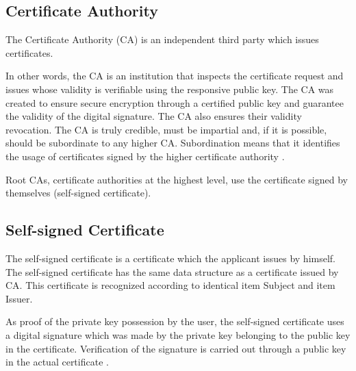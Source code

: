 \documentclass[
  digital, %
  notable,   %
  lof,     %
  lot,     %
]{fithesis3}
\begin{document}
\subsection{Certificate Authority}
The Certificate Authority (CA) is an independent third party which issues certificates.

In other words, the CA is an institution that inspects the certificate request and issues whose 
validity is verifiable using the responsive public key. The CA was created %
to ensure secure encryption through a certified public key and guarantee the validity of the 
digital signature. The CA also ensures their validity revocation. The CA is truly credible, must 
be impartial and, if it is possible, should be subordinate to any higher CA. Subordination means 
that it identifies the usage of certificates signed by the higher certificate authority 
\cite{dostalek2016velky}.

Root CAs, certificate authorities at the highest level, use the certificate signed by 
themselves (self-signed certificate).

\nocite{singh2003kniha}

\subsection{Self-signed Certificate}
The self-signed certificate is a certificate which the applicant issues by himself. The 
self-signed certificate has the same data structure as a certificate issued by CA. This 
certificate is recognized according to identical item Subject and item Issuer.

As proof of the private key possession by the user, the self-signed certificate uses a 
digital signature which was made by the private key belonging to the public key 
in the certificate. Verification of the signature is carried out through a public key in the 
actual certificate \cite{dostalek2016velky}.

\end{document}
